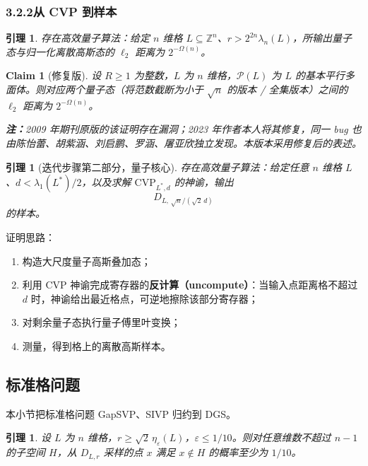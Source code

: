 \documentclass[11pt,a4paper]{article}
\newtheorem{lemma}[theorem]{引理}
\newtheorem{claim}[theorem]{Claim}
\newcommand{\Z}{\mathbb{Z}}
\begin{document}
\subsubsection*{3.2.2\quad 从 CVP 到样本}

\begin{lemma}
存在高效量子算法：给定 $n$ 维格 $L\subseteq\Z^{n}$、$r>2^{2n}\lambda_{n}(L)$，所输出量子态与归一化离散高斯态的 $\ell_{2}$ 距离为 $2^{-\Omega(n)}$。
\end{lemma}

\begin{claim}[修复版]
设 $R\ge 1$ 为整数，$L$ 为 $n$ 维格，$\mathcal{P}(L)$ 为 $L$ 的基本平行多面体。则对应两个量子态（将范数截断为小于 $\sqrt{n}$ 的版本 / 全集版本）之间的 $\ell_{2}$ 距离为 $2^{-\Omega(n)}$。

\textbf{注：}2009 年期刊原版的该证明存在漏洞；2023 年作者本人将其修复，同一 bug 也由陈怡蕾、胡紫涵、刘启鹏、罗涵、屠亚欣独立发现。本版本采用修复后的表述。
\end{claim}

\begin{lemma}[迭代步骤第二部分，量子核心]
存在高效量子算法：给定任意 $n$ 维格 $L$、$d<\lambda_{1}(L^{*})/2$，以及求解 $\mathrm{CVP}_{L^{*},d}$ 的神谕，输出
\[
  D_{L,\,\sqrt{n}/(\sqrt{2}\,d)}
\]
的样本。
\end{lemma}

证明思路：

\begin{enumerate}[label=\arabic*.]
  \item 构造大尺度量子高斯叠加态；
  \item 利用 CVP 神谕完成寄存器的\textbf{反计算（uncompute）}：当输入点距离格不超过 $d$ 时，神谕给出最近格点，可逆地擦除该部分寄存器；
  \item 对剩余量子态执行量子傅里叶变换；
  \item 测量，得到格上的离散高斯样本。
\end{enumerate}

\subsection{标准格问题}

本小节把标准格问题 GapSVP、SIVP 归约到 DGS。

\begin{lemma}
设 $L$ 为 $n$ 维格，$r\ge\sqrt{2}\,\eta_{\varepsilon}(L)$，$\varepsilon\le 1/10$。则对任意维数不超过 $n-1$ 的子空间 $H$，从 $D_{L,r}$ 采样的点 $x$ 满足 $x\notin H$ 的概率至少为 $1/10$。
\end{lemma}
\end{document}
